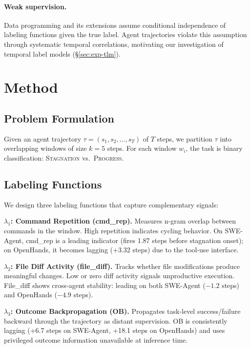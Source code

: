 \documentclass[11pt,a4paper]{article}
\begin{document}
\paragraph{Weak supervision.}
Data programming \cite{ratner2016data} and its extensions assume conditional independence of labeling functions given the true label.
Agent trajectories violate this assumption through systematic temporal correlations, motivating our investigation of temporal label models (\S\ref{sec:exp-tlm}).

\section{Method}
\label{sec:method}

\subsection{Problem Formulation}

Given an agent trajectory $\tau = (s_1, s_2, \ldots, s_T)$ of $T$ steps, we partition $\tau$ into overlapping windows of size $k{=}5$ steps.
For each window $w_i$, the task is binary classification: \textsc{Stagnation} vs.\ \textsc{Progress}.

\subsection{Labeling Functions}

We design three labeling functions that capture complementary signals:

\textbf{$\lambda_1$: Command Repetition (cmd\_rep).} Measures n-gram overlap between commands in the window. High repetition indicates cycling behavior. On SWE-Agent, cmd\_rep is a leading indicator (fires 1.87 steps before stagnation onset); on OpenHands, it becomes lagging (+3.32 steps) due to the tool-use interface.

\textbf{$\lambda_2$: File Diff Activity (file\_diff).} Tracks whether file modifications produce meaningful changes. Low or zero diff activity signals unproductive execution. File\_diff shows cross-agent stability: leading on both SWE-Agent ($-1.2$ steps) and OpenHands ($-4.9$ steps).

\textbf{$\lambda_3$: Outcome Backpropagation (OB).} Propagates task-level success/failure backward through the trajectory as distant supervision. OB is consistently lagging (+6.7 steps on SWE-Agent, +18.1 steps on OpenHands) and uses privileged outcome information unavailable at inference time.
\end{document}
